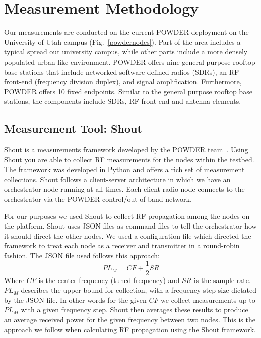 

\section{Measurement Methodology}
\label{sec:method}
Our measurements are conducted on the current POWDER deployment
on the University of Utah campus (Fig.~\ref{powdernodes}).
Part of the area includes a typical spread out university campus, while other parts
include a more densely populated urban-like environment. POWDER offers nine general purpose rooftop base stations that include networked software-defined-radios (SDRs), an RF front-end (frequency division duplex), and signal amplification. Furthermore, POWDER offers 10 fixed endpoints. 
Similar to the general purpose rooftop base stations, the components include SDRs, RF front-end and antenna elements. 

\subsection{Measurement Tool: Shout}
Shout is a measurements framework developed by the POWDER team~\cite{b2}. Using Shout you are able to collect RF
measurements for the nodes within the testbed. The framework was developed in Python and offers a rich set of measurement
collections. Shout follows a client-server architecture in which we have an orchestrator node running at all times. Each client 
radio node connects to the orchestrator via the POWDER control/out-of-band network. 

For our purposes we used Shout to collect RF propagation among the nodes on the platform. Shout uses JSON files as 
command files to tell the orchestrator how it should direct the other nodes. We used a configuration file which directed the
framework to treat each node as a receiver and transmitter in a round-robin fashion. The JSON file used follows this approach:
\begin{equation}
PL_M = CF + \frac{1}{2}SR\label{eq5}
\end{equation}
Where $CF$ is the center frequency (tuned frequency) and $SR$ is the sample rate. $PL_M$ describes the upper bound for
collection, with a frequency step size dictated by the JSON file. In other words for the given $CF$ we collect measurements 
up to $PL_M$ with a given frequency step. Shout then averages these results to produce an average received power for the
given frequency between two nodes. This is the approach we follow when calculating RF propagation using the Shout framework.

